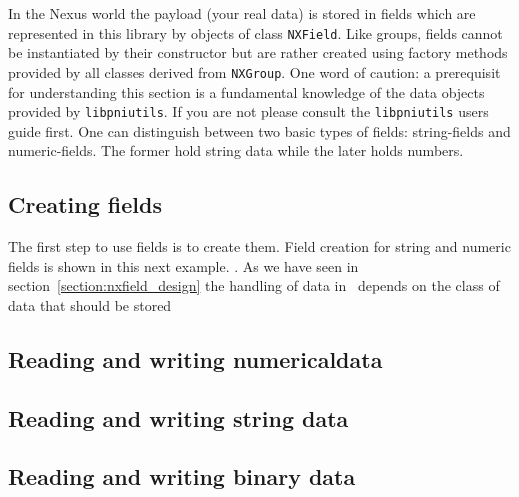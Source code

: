
In the Nexus world the payload (your real data) is stored in fields which 
are represented in this library by objects of class {\tt NXField}.
Like groups, fields cannot be instantiated by their constructor but are 
rather created using factory methods provided by all classes derived 
from  {\tt NXGroup}. One word of caution: a prerequisit for understanding 
this section is a fundamental knowledge of the data objects provided 
by {\tt libpniutils}. If you are not please consult the {\tt libpniutils}
users guide first.
One can distinguish between two basic types of fields: string-fields
and numeric-fields. The former hold string data while the later 
holds numbers.   

\subsection{Creating fields}

The first step to use fields is to create them. Field creation for 
string and numeric fields is shown in this next example. 
.
As we have seen in section~\ref{section:nxfield_design} the handling 
of data in \nxfield\ depends on the class of data that should be stored 




\subsection{Reading and writing numericaldata}
\label{section:nxfield_numeric_io}

\subsection{Reading and writing string data}
\label{section:nxfield_string_io}

\subsection{Reading and writing binary data}
\label{section:nxfield_binary_io}
